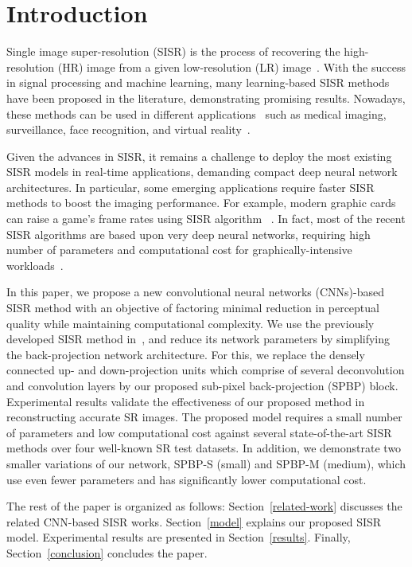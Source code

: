 \documentclass[a4paper,11pt]{article}
\begin{document}
\section{Introduction}


Single image super-resolution (SISR) is the process of recovering the high-resolution (HR) image from a given low-resolution (LR) image~\cite{super_res_def_2003}. With the success in signal processing and machine learning, many learning-based SISR methods have been proposed in the literature, demonstrating promising results. Nowadays, these methods can be used in different applications~\cite{yang2014single, Wang2019-qi} such as medical imaging, surveillance, face recognition, and virtual reality~\cite{OzcinarRana2019}.

Given the advances in SISR, it remains a challenge to deploy the most existing SISR models in real-time applications, demanding compact deep neural network architectures. In particular, some emerging applications require faster SISR methods to boost the imaging performance. For example, modern graphic cards can raise a game's frame rates using SISR algorithm ~\cite{nvidiadlss}. In fact, most of the recent SISR algorithms are based upon very deep neural networks, requiring high number of parameters and computational cost for graphically-intensive workloads~\cite{yang_survey}. 

In this paper, we propose a new convolutional neural networks (CNNs)-based SISR method with an objective of factoring minimal reduction in perceptual quality while maintaining computational complexity. We use the previously developed SISR method in~\cite{DBPN}, and reduce its network parameters by simplifying the back-projection network architecture. For this, we replace the densely connected up- and down-projection units which comprise of several deconvolution and convolution layers by our proposed sub-pixel back-projection (SPBP) block. Experimental results validate the effectiveness of our proposed method in reconstructing accurate SR images. The proposed model requires a small number of parameters and low computational cost against several state-of-the-art SISR methods over four well-known SR test datasets. In addition, we demonstrate two smaller variations of our network, SPBP-S (small) and SPBP-M (medium), which use even fewer parameters and has significantly lower computational cost. 




The rest of the paper is organized as follows: Section~\ref{related-work} discusses the related CNN-based SISR works. Section~\ref{model} explains our proposed SISR model. Experimental results are presented in Section~\ref{results}. Finally, Section~\ref{conclusion} concludes the paper.
\end{document}
